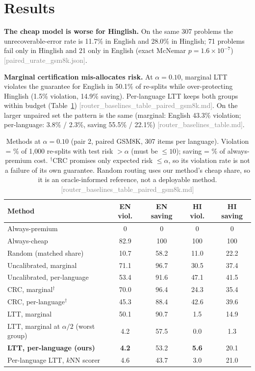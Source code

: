 \documentclass[11pt]{article}
\newcommand{\src}[1]{\textcolor{gray}{\footnotesize[#1]}}
\begin{document}
\section{Results}
\textbf{The cheap model is worse for Hinglish.} On the same 307 problems the unrecoverable-error
rate is 11.7\% in English and 28.0\% in Hinglish; 71 problems fail only in Hinglish and 21 only
in English (exact McNemar $p=1.6\times10^{-7}$) \src{paired\_urate\_gsm8k.json}.

\textbf{Marginal certification mis-allocates risk.} At $\alpha=0.10$, marginal LTT violates
the guarantee for English in 50.1\% of re-splits while over-protecting Hinglish (1.5\%
violation, 14.9\% saving). Per-language LTT keeps both groups within budget
(Table~\ref{tab:main}) \src{router\_baselines\_table\_paired\_gsm8k.md}. On the larger
unpaired set the pattern is the same (marginal: English 43.3\% violation; per-language:
3.8\% / 2.3\%, saving 55.5\% / 22.1\%) \src{router\_baselines\_table.md}.

\begin{table}[h]\centering\small
\caption{Methods at $\alpha=0.10$ (pair 2, paired GSM8K, 307 items per language). Violation = \% of 1{,}000 re-splits with test
risk $>\alpha$ (must be $\le 10$); saving = \% of always-premium cost. $^\dagger$CRC promises
only expected risk $\le\alpha$, so its violation rate is not a failure of its own guarantee.
Random routing uses our method's cheap share, so it is an oracle-informed reference, not a
deployable method. \src{router\_baselines\_table\_paired\_gsm8k.md}}\label{tab:main}
\begin{tabular}{lcccc}\toprule
Method & EN viol. & EN saving & HI viol. & HI saving\\\midrule
Always-premium & 0 & 0 & 0 & 0\\
Always-cheap & 82.9 & 100 & 100 & 100\\
Random (matched share) & 10.7 & 58.2 & 11.0 & 22.2\\
Uncalibrated, marginal & 71.1 & 96.7 & 30.5 & 37.4\\
Uncalibrated, per-language & 53.4 & 91.6 & 47.1 & 41.5\\
CRC, marginal$^\dagger$ & 70.0 & 96.4 & 24.3 & 35.4\\
CRC, per-language$^\dagger$ & 45.3 & 88.4 & 42.6 & 39.6\\
LTT, marginal & 50.1 & 90.7 & 1.5 & 14.9\\
LTT, marginal at $\alpha/2$ (worst group) & 4.2 & 57.5 & 0.0 & 1.3\\
\textbf{LTT, per-language (ours)} & \textbf{4.2} & 53.2 & \textbf{5.6} & 20.1\\
Per-language LTT, $k$NN scorer & 4.6 & 43.7 & 3.0 & 21.0\\
\bottomrule\end{tabular}\end{table}
\end{document}
